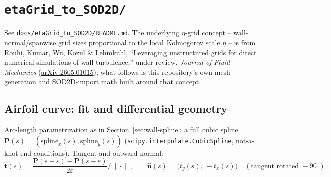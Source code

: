 \documentclass[11pt]{article}
\newcommand{\vecb}[1]{\bm{#1}}
\begin{document}
\section{\texttt{etaGrid\_to\_SOD2D/}}
\label{sec:etagrid}
See \href{https://github.com/kvishalrai/AeroHexMesh/blob/master/docs/etaGrid_to_SOD2D/README.md}{\texttt{docs/etaGrid\_to\_SOD2D/README.md}}.
The underlying \(\eta\)-grid concept -- wall-normal/spanwise grid sizes
proportional to the local Kolmogorov scale \(\eta\) -- is from Rouhi,
Kumar, Wu, Kozul \& Lehmkuhl, ``Leveraging unstructured grids for direct
numerical simulations of wall turbulence,'' under review, \emph{Journal
of Fluid Mechanics}
(\href{https://arxiv.org/abs/2605.01015}{arXiv:2605.01015}); what
follows is this repository's own mesh-generation and SOD2D-import math
built around that concept.

\subsection{Airfoil curve: fit and differential geometry}
Arc-length parametrization as in Section~\ref{sec:wall-spline}; a full cubic
spline \(\vecb{P}(s) = (\mathrm{spline}_x(s), \mathrm{spline}_y(s))\)
(\texttt{scipy.interpolate.CubicSpline}, not-a-knot end conditions).
Tangent and outward normal:
\begin{equation}
\hat{\vecb{t}}(s) = \frac{\vecb{P}(s+\varepsilon) - \vecb{P}(s-\varepsilon)}{2\varepsilon}
\Big/ \Big\lVert \cdot \Big\rVert, \qquad
\hat{\vecb{n}}(s) = \big(t_y(s),\ -t_x(s)\big) \quad (\text{tangent rotated } -90^\circ).
\end{equation}
\end{document}
